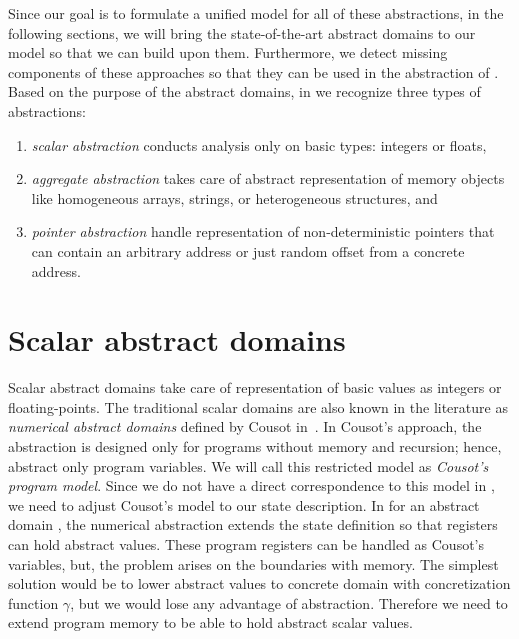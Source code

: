 Since our goal is to formulate a unified model for all of these abstractions,
in the following sections, we will bring the state-of-the-art abstract
domains to our \llvm model so that we can build upon them. Furthermore, we
detect missing components of these approaches so that they can be used in the
abstraction of \llvm. Based on the purpose of the abstract domains, in \llvm we
recognize three types of abstractions:
\begin{enumerate}
    \item \emph{scalar abstraction} conducts analysis only on basic types:
        integers or floats,
    \item \emph{aggregate abstraction} takes care of abstract representation of
        memory objects like homogeneous arrays, strings, or heterogeneous
        structures, and
    \item \emph{pointer abstraction} handle representation of non-deterministic
        pointers that can contain an arbitrary address or just random offset
        from a concrete address.
\end{enumerate}

\section{Scalar abstract domains}
\label{sec:domains}

Scalar abstract domains take care of representation of basic \llvm values as
integers or floating-points. The traditional scalar domains are also known in
the literature as \emph{numerical abstract domains} defined by Cousot
in~\cite{Cousot1977}. In Cousot's approach, the abstraction is designed only
for programs without memory and recursion; hence, abstract only program
variables. We will call this restricted model as \emph{Cousot's program model}.
Since we do not have a direct correspondence to this model in \llvm, we need to
adjust Cousot's model to our state description. In \llvm for an abstract domain
\domain{}, the numerical abstraction extends the state definition so that
registers can hold abstract values. These program registers can be handled as
Cousot's variables, but, the problem arises on the boundaries with memory.
The simplest solution would be to lower abstract values to concrete domain with
concretization function $\gamma$, but we would lose any advantage of abstraction.
Therefore we need to extend \llvm program memory to be able to hold abstract
scalar values.


